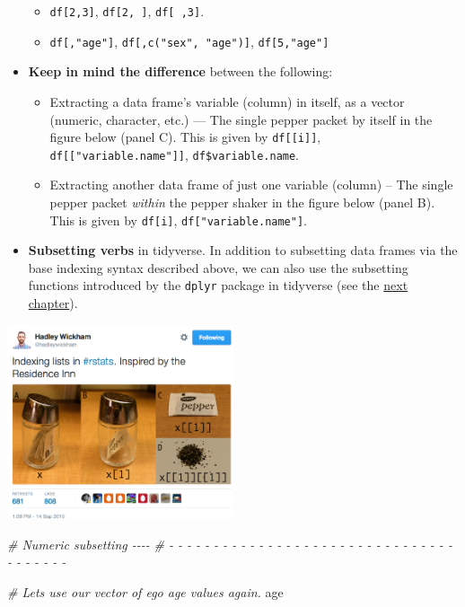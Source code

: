 \documentclass[
]{book}
\newenvironment{Shaded}{\begin{snugshade}}{\end{snugshade}}
\newcommand{\CommentTok}[1]{\textcolor[rgb]{0.56,0.35,0.01}{\textit{#1}}}
\newcommand{\NormalTok}[1]{#1}
\providecommand{\tightlist}{%
  \setlength{\itemsep}{0pt}\setlength{\parskip}{0pt}}
\begin{document}
\begin{itemize}
  \begin{itemize}
  \tightlist
  \item
    \texttt{df{[}2,3{]}}, \texttt{df{[}2,\ {]}}, \texttt{df{[}\ ,3{]}}.
  \item
    \texttt{df{[},"age"{]}}, \texttt{df{[},c("sex",\ "age"){]}}, \texttt{df{[}5,"age"{]}}
  \end{itemize}
\item
  \textbf{Keep in mind the difference} between the following:

  \begin{itemize}
  \tightlist
  \item
    Extracting a data frame's variable (column) in itself, as a vector (numeric, character, etc.) --- The single pepper packet by itself in the figure below (panel C). This is given by \texttt{df{[}{[}i{]}{]}}, \texttt{df{[}{[}"variable.name"{]}{]}}, \texttt{df\$variable.name}.
  \item
    Extracting another data frame of just one variable (column) -- The single pepper packet \emph{within} the pepper shaker in the figure below (panel B). This is given by \texttt{df{[}i{]}}, \texttt{df{[}"variable.name"{]}}.
  \end{itemize}
\item
  \textbf{Subsetting verbs} in tidyverse. In addition to subsetting data frames via the base indexing syntax described above, we can also use the subsetting functions introduced by the \texttt{dplyr} package in tidyverse (see the \protect\hyperlink{wrangling}{next chapter}).
\end{itemize}

\href{https://twitter.com/hadleywickham/status/643381054758363136?lang=en}{\includegraphics[width=0.5\textwidth,height=\textheight]{./figures/wickham_indexing_tweet.png}}

\begin{Shaded}
\begin{Highlighting}[]
\CommentTok{\# Numeric subsetting                                                          {-}{-}{-}{-}}
\CommentTok{\# {-} {-} {-} {-} {-} {-} {-} {-} {-} {-} {-} {-} {-} {-} {-} {-} {-} {-} {-} {-} {-} {-} {-} {-} {-} {-} {-} {-} {-} {-} {-} {-} {-} {-} {-} {-} {-} {-} {-} }

\CommentTok{\# Let\textquotesingle{}s use our vector of ego age values again.}
\NormalTok{age}
\end{Highlighting}
\end{Shaded}
\end{document}
